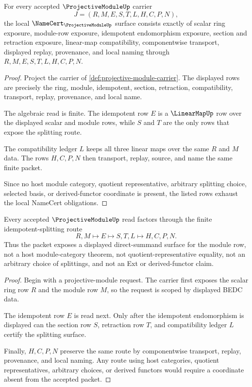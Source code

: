 \begin{theorem}
\label{thm:projective-module-namecert-obligations}
For every accepted $\ProjectiveModuleUp$ carrier
$$
J=(R,M,E,S,T,L,H,C,P,N),
$$
the local $\NameCert_{\ProjectiveModuleUp}$ surface consists exactly of scalar ring exposure, module-row exposure, idempotent endomorphism exposure, section and retraction exposure, linear-map compatibility, componentwise transport, displayed replay, provenance, and local naming through $R,M,E,S,T,L,H,C,P,N$.
\end{theorem}
\begin{proof}
Project the carrier of \autoref{def:projective-module-carrier}. The displayed rows are precisely the ring, module, idempotent, section, retraction, compatibility, transport, replay, provenance, and local name.

The algebraic read is finite. The idempotent row $E$ is a $\LinearMapUp$ row over the displayed scalar and module rows, while $S$ and $T$ are the only rows that expose the splitting route.

The compatibility ledger $L$ keeps all three linear maps over the same $R$ and $M$ data. The rows $H,C,P,N$ then transport, replay, source, and name the same finite packet.

Since no host module category, quotient representative, arbitrary splitting choice, selected basis, or derived-functor coordinate is present, the listed rows exhaust the local NameCert obligations.
\end{proof}

\begin{theorem}
\label{thm:projective-module-idempotent-splitting}
Every accepted $\ProjectiveModuleUp$ read factors through the finite idempotent-splitting route
$$
R,M \longmapsto E \longmapsto S,T,L \longmapsto H,C,P,N.
$$
Thus the packet exposes a displayed direct-summand surface for the module row, not a host module-category theorem, not quotient-representative equality, not an arbitrary choice of splittings, and not an Ext or derived-functor claim.
\end{theorem}
\begin{proof}
Begin with a projective-module request. The carrier first exposes the scalar ring row $R$ and the module row $M$, so the request is scoped by displayed BEDC data.

The idempotent row $E$ is read next. Only after the idempotent endomorphism is displayed can the section row $S$, retraction row $T$, and compatibility ledger $L$ certify the splitting surface.

Finally, $H,C,P,N$ preserve the same route by componentwise transport, replay, provenance, and local naming. Any route using host categories, quotient representatives, arbitrary choices, or derived functors would require a coordinate absent from the accepted packet.
\end{proof}

